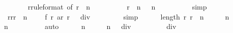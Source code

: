 \begin{isabellebody}
\ \ \ \ \ \ \isamarkupfalse%
\ r{\isacharparenleft}{}{\isacharparenright}{\isacharbrackleft}rule{\isacharunderscore}format{\isacharcomma}\ of\ {\isachardoublequoteopen}r{}\ {\isacharplus}\ n\ {\isacharminus}\ {}{\isachardoublequoteclose}{\isacharbrackright}\isanewline
\ \ \ \ \ \ \isamarkupfalse%
\ {\isacartoucheopen}r{}\ {\isacharplus}\ n\ {\isasymle}\ {}{}{}{}{\isacartoucheclose}\ {\isacharbackquoteopen}n\ {\isasymge}\ {}{}{}{}{\isacharbackquoteclose}\isanewline
\ \ \ \ \ \ \isamarkupfalse%
\ simp\isanewline
\isanewline
\ \ \ \ \isamarkupfalse%
\isanewline
\isanewline
\ \ \ \ \isamarkupfalse%
\ {}{\isacharcolon}\ {\isachardoublequoteopen}{\isacharparenleft}{\isasymSum}r{\isacharprime}{\isasymleftarrow}{\isacharbrackleft}r{}{\isachardot}{\isachardot}{\isacharless}{\isacharparenleft}r{}\ {\isacharplus}\ n\ {\isacharminus}\ {}{\isacharparenright}\ {\isacharplus}\ {}{\isacharbrackright}{\isachardot}\ f\ r{\isacharprime}\ {\isacharparenleft}ar\ r{\isacharprime}{\isacharparenright}{\isacharparenright}\ {\isasymle}\ {}{}{}{}{\isacharasterisk}{\isacharparenleft}{}{}{}{}{\isacharplus}{}{\isacharparenright}\ div\ {}{\isachardoublequoteclose}\isanewline
\ \ \ \ \ \ \isamarkupfalse%
\ simp\isanewline
\isanewline
\ \ \ \ \isamarkupfalse%
\ {\isachardoublequoteopen}length\ {\isacharparenleft}{\isacharbrackleft}r{}{\isachardot}{\isachardot}{\isacharless}\ {\isacharparenleft}r{}\ {\isacharplus}\ n\ {\isacharminus}\ {}{\isacharparenright}\ {\isacharplus}\ {}{\isacharbrackright}{\isacharparenright}\ {\isacharequal}\ n{\isachardoublequoteclose}\isanewline
\ \ \ \ \ \ \isamarkupfalse%
\ {\isacharbackquoteopen}n\ {\isasymge}\ {}{}{}{}{\isacharbackquoteclose}\isanewline
\ \ \ \ \ \ \isamarkupfalse%
\ auto\isanewline
\isanewline
\ \ \ \ \isamarkupfalse%
\ {\isachardoublequoteopen}n\ {\isacharasterisk}\ {\isacharparenleft}{}\ {\isacharasterisk}\ {}{}{}{}\ {\isacharplus}\ n\ {\isacharplus}\ {}{\isacharparenright}\ div\ {}\ {\isasymge}\ {}{}{}{}\ {\isacharasterisk}\ {\isacharparenleft}{}{\isacharasterisk}{}{}{}{}\ {\isacharplus}\ {}{}{}{}\ {\isacharplus}\ {}{\isacharparenright}\ div\ {}\ {\isachardoublequoteclose}\isanewline

\end{isabellebody}
